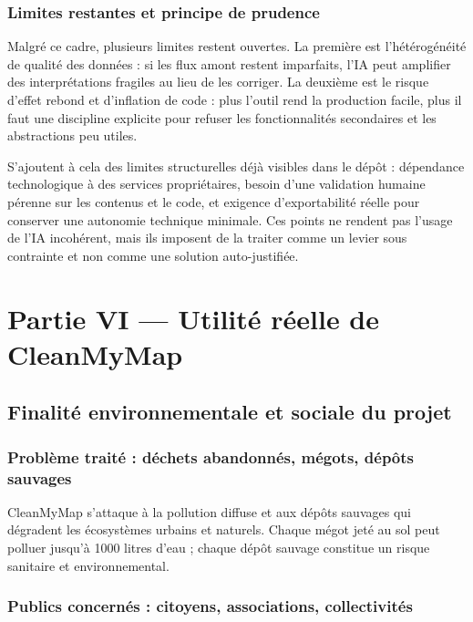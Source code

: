 \documentclass[
  10pt,
  a4paper,
  DIV=11,
  numbers=noendperiod,
  oneside]{scrreprt}
\begin{document}
\subsection{Limites restantes et principe de
prudence}\label{limites-restantes-et-principe-de-prudence}

Malgré ce cadre, plusieurs limites restent ouvertes. La première est
l'hétérogénéité de qualité des données : si les flux amont restent
imparfaits, l'IA peut amplifier des interprétations fragiles au lieu de
les corriger. La deuxième est le risque d'effet rebond et d'inflation de
code : plus l'outil rend la production facile, plus il faut une
discipline explicite pour refuser les fonctionnalités secondaires et les
abstractions peu utiles.

S'ajoutent à cela des limites structurelles déjà visibles dans le dépôt
: dépendance technologique à des services propriétaires, besoin d'une
validation humaine pérenne sur les contenus et le code, et exigence
d'exportabilité réelle pour conserver une autonomie technique minimale.
Ces points ne rendent pas l'usage de l'IA incohérent, mais ils imposent
de la traiter comme un levier sous contrainte et non comme une solution
auto-justifiée.

\chapter{Partie VI --- Utilité réelle de
CleanMyMap}\label{partie-vi-utilite-reelle-de-cleanmymap}

\section{Finalité environnementale et sociale du
projet}\label{finalituxe9-environnementale-et-sociale-du-projet}

\subsection{Problème traité : déchets abandonnés, mégots, dépôts
sauvages}\label{probluxe8me-traituxe9-duxe9chets-abandonnuxe9s-muxe9gots-duxe9puxf4ts-sauvages}

CleanMyMap s'attaque à la pollution diffuse et aux dépôts sauvages qui
dégradent les écosystèmes urbains et naturels. Chaque mégot jeté au sol
peut polluer jusqu'à 1000 litres d'eau ; chaque dépôt sauvage constitue
un risque sanitaire et environnemental.

\subsection{Publics concernés : citoyens, associations,
collectivités}\label{publics-concernuxe9s-citoyens-associations-collectivituxe9s}
\end{document}
